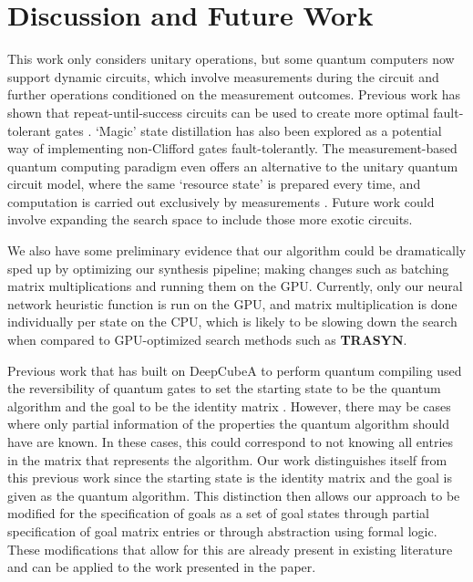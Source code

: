 \documentclass[letterpaper]{article} %
\begin{document}
\section{Discussion and Future Work}

This work only considers unitary operations, but some quantum computers now support dynamic circuits,
which involve measurements during the circuit and further operations conditioned on the measurement outcomes.
Previous work has shown that repeat-until-success circuits can be
used to create more optimal fault-tolerant gates \cite{bocharov2015efficient}.
‘Magic’ state distillation \cite{bravyi2005universal} has also been explored as a potential
way of implementing non-Clifford gates fault-tolerantly.
The measurement-based quantum computing paradigm even offers an alternative to the unitary quantum circuit model,
where the same ‘resource state’ is prepared every time, and computation is carried out exclusively by measurements
\cite{briegel2009measurement}.
Future work could involve expanding the search space to include those more exotic circuits.

We also have some preliminary evidence that our algorithm could be dramatically sped up by
optimizing our synthesis pipeline; making changes such as batching matrix multiplications and running them on the GPU.
Currently, only our neural network heuristic function is run on the GPU, and matrix multiplication is done
individually per state on the CPU, which is likely to be slowing down the search when compared to GPU-optimized search
methods such as \textbf{TRASYN}.


Previous work that has built on DeepCubeA to perform quantum compiling used the reversibility of quantum gates
to set the starting state to be the quantum algorithm and the goal to be the identity matrix
\cite{zhang2020topological,bao2024twisty,chen2024efficient}. However, there may be cases where only partial information of the properties the quantum algorithm should have are known. In these cases, this could correspond to not knowing all entries in the matrix that represents the algorithm. Our work distinguishes itself from this previous work since the starting state is the identity matrix and the goal is given as the quantum algorithm. This distinction then allows our approach to be modified for the specification of goals as a set of goal states through partial specification of goal matrix entries or through abstraction using formal logic. These modifications that allow for this are already present in existing literature \cite{agostinelli2024specifying}
and can be applied to the work presented in the paper.
\end{document}

